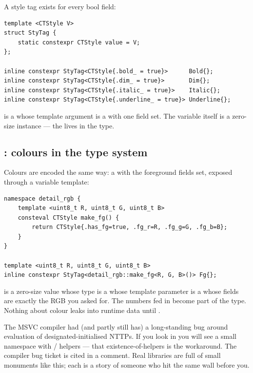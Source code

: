 A style tag exists for every bool field:

\begin{lstlisting}
template <CTStyle V>
struct StyTag {
    static constexpr CTStyle value = V;
};

inline constexpr StyTag<CTStyle{.bold_ = true}>      Bold{};
inline constexpr StyTag<CTStyle{.dim_ = true}>       Dim{};
inline constexpr StyTag<CTStyle{.italic_ = true}>    Italic{};
inline constexpr StyTag<CTStyle{.underline_ = true}> Underline{};
\end{lstlisting}

 is a  whose template argument is a
 with one field set. The variable  itself
is a zero-size instance --- the  lives in the type.

\subsection{: colours in the type system}

Colours are encoded the same way: a  with the
foreground fields set, exposed through a variable template:

\begin{lstlisting}
namespace detail_rgb {
    template <uint8_t R, uint8_t G, uint8_t B>
    consteval CTStyle make_fg() {
        return CTStyle{.has_fg=true, .fg_r=R, .fg_g=G, .fg_b=B};
    }
}

template <uint8_t R, uint8_t G, uint8_t B>
inline constexpr StyTag<detail_rgb::make_fg<R, G, B>()> Fg{};
\end{lstlisting}

 is a zero-size value whose type is a
 whose template parameter is a  whose
fields are exactly the RGB you asked for. The numbers fed in become
part of the type. Nothing about colour leaks into runtime data
until .

\begin{funfact}
The MSVC compiler had (and partly still has) a long-standing bug
around  evaluation of designated-initialised NTTPs.
If you look in  you will see a small namespace
 with  /  helpers ---
that existence-of-helpers is the workaround. The compiler bug ticket
is cited in a comment. Real libraries are full of small monuments
like this; each is a story of someone who hit the same wall before
you.
\end{funfact}

